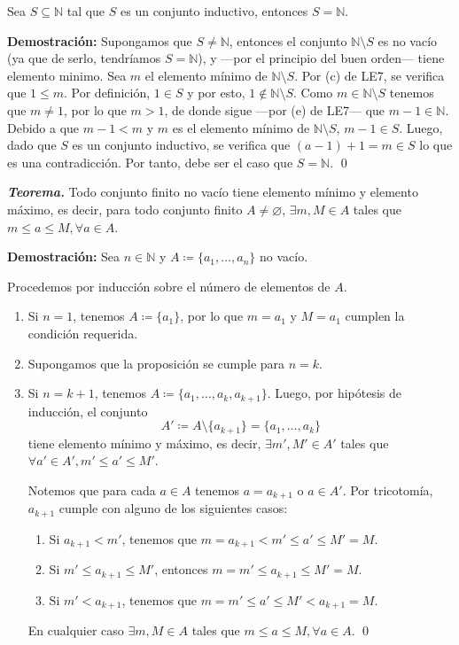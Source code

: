 \documentclass[11pt]{article}
\newcommand{\N}{\mathbb{N}}
\let\emptyset\varnothing
\begin{document}
Sea $S\subseteq \N$ tal que $S$ es un conjunto inductivo, entonces $S=\N$.

\textbf{Demostración:} Supongamos que $S\neq \N$, entonces el conjunto $\N\setminus S$ es no vacío (ya que de serlo, tendríamos $S=\N$), y —por el principio del buen orden— tiene elemento minimo. Sea $m$ el elemento mínimo de $\N\setminus S$. Por (c) de LE7, se verifica que $1 \leq m$. Por definición, $1\in S$ y por esto, $1\notin \N\setminus S$. Como $m\in \N\setminus S$ tenemos que $m\neq 1$, por lo que $m>1$, de donde sigue —por (e) de LE7— que $m-1\in \N$. Debido a que $m-1<m$ y $m$ es el elemento mínimo de $\N \setminus S$, $m-1\in S$. Luego, dado que $S$ es un conjunto inductivo, se verifica que $(a-1)+1=m\in S$ lo que es una contradicción. Por tanto, debe ser el caso que $S=\N$. \qed

\textbf{\textit{Teorema.}} Todo conjunto finito no vacío tiene elemento mínimo y elemento máximo, es decir, para todo conjunto finito $A\neq \emptyset$, $\exists m,M\in A$ tales que $m\leq a\leq M, \forall a\in A$.

\textbf{Demostración:} Sea $n\in \N$ y $A \coloneqq \{a_1, \dots, a_n\}$ no vacío.

Procedemos por inducción sobre el número de elementos de $A$. \begin{enumerate}[label=\roman*)]
    \item Si $n=1$, tenemos $A\coloneqq\{a_1\}$, por lo que $m=a_1$ y $M=a_1$ cumplen la condición requerida.
    \item Supongamos que la proposición se cumple para $n=k$.
    \item Si $n=k+1$, tenemos $A\coloneqq \{a_1, \dots, a_k, a_{k+1}\}$. Luego, por hipótesis de inducción, el conjunto \[A' \coloneqq A \setminus \{a_{k+1}\} = \{a_1, \dots, a_k\}\] tiene elemento mínimo y máximo, es decir, $\exists m',M'\in A'$ tales que $\forall a'\in A', m'\leq a' \leq M'$.
    
    Notemos que para cada $a\in A$ tenemos $a=a_{k+1}$ o $a\in A'$. Por tricotomía, $a_{k+1}$ cumple con alguno de los siguientes casos:
    \begin{enumerate}[label=\alph*)]
        \item Si $a_{k+1}<m'$, tenemos que $m=a_{k+1}<m'\leq a' \leq M'=M$.
        \item Si $m' \leq a_{k+1}\leq M'$, entonces $m=m'\leq a_{k+1} \leq M'=M$.
        \item Si $m'<a_{k+1}$, tenemos que $m=m'\leq a' \leq M'<a_{k+1}=M$.
    \end{enumerate}
    En cualquier caso $\exists m,M\in A$ tales que $m\leq a\leq M, \forall a\in A$. \qed
\end{enumerate}
\end{document}
